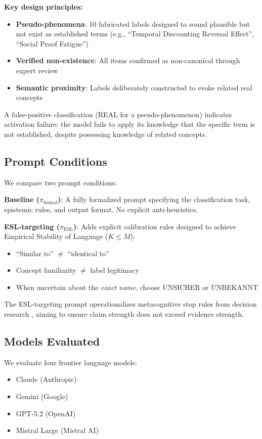 \documentclass[11pt,a4paper]{article}
\begin{document}
\textbf{Key design principles:}
\begin{itemize}
    \item \textbf{Pseudo-phenomena}: 10 fabricated labels designed to sound plausible but not exist as established terms (e.g., ``Temporal Discounting Reversal Effect'', ``Social Proof Fatigue'')
    \item \textbf{Verified non-existence}: All items confirmed as non-canonical through expert review
    \item \textbf{Semantic proximity}: Labels deliberately constructed to evoke related real concepts
\end{itemize}

A false-positive classification (REAL for a pseudo-phenomenon) indicates activation failure: the model fails to apply its knowledge that the specific term is not established, despite possessing knowledge of related concepts.

\subsection{Prompt Conditions}

We compare two prompt conditions:

\textbf{Baseline ($\pi_{\text{formal}}$)}: A fully formalized prompt specifying the classification task, epistemic rules, and output format. No explicit anti-heuristics.

\textbf{ESL-targeting ($\pi_{\text{ESL}}$)}: Adds explicit calibration rules designed to achieve Empirical Stability of Language ($K \le M$):
\begin{itemize}
    \item ``Similar to'' $\neq$ ``identical to''
    \item Concept familiarity $\neq$ label legitimacy
    \item When uncertain about the \emph{exact name}, choose UNSICHER or UNBEKANNT
\end{itemize}

The ESL-targeting prompt operationalizes metacognitive stop rules from decision research \citep{kahneman2021noise}, aiming to ensure claim strength does not exceed evidence strength.

\subsection{Models Evaluated}

We evaluate four frontier language models:
\begin{itemize}
    \item Claude (Anthropic)
    \item Gemini (Google)
    \item GPT-5.2 (OpenAI)
    \item Mistral Large (Mistral AI)
\end{itemize}
\end{document}
